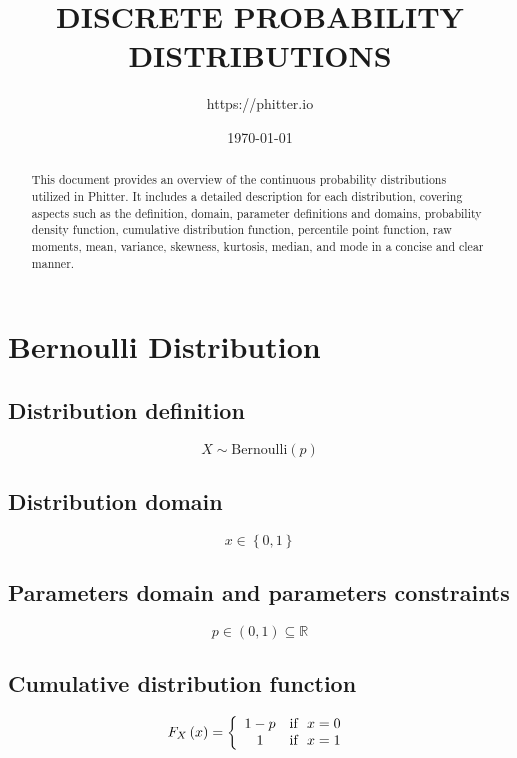 \documentclass{article}
\begin{document}
\title{\textbf{DISCRETE PROBABILITY DISTRIBUTIONS}}
\author{https://phitter.io}
\date{\today}
\maketitle
\begin{abstract}
    This document provides an overview of the continuous probability distributions utilized in Phitter. It includes a detailed description for each distribution, covering aspects such as the definition, domain, parameter definitions and domains, probability density function, cumulative distribution function, percentile point function, raw moments, mean, variance, skewness, kurtosis, median, and mode in a concise and clear manner.
\end{abstract}

\newpage
\tableofcontents


\newpage
\section{Bernoulli Distribution}
\subsection{Distribution definition}
\begin{equation*} X\sim\mathrm{Bernoulli}\left(p\right) \end{equation*}
\subsection{Distribution domain}
\begin{equation*} x\in\left\{0,1\right\} \end{equation*}
\subsection{Parameters domain and parameters constraints}
\begin{equation*} p\in\left(0,1\right)\subseteq\mathbb{R} \end{equation*}
\subsection{Cumulative distribution function}
\begin{equation*} F_{X}\left(x\right)=\left\{\begin{array}{cl} 1-p & \text{if } \ x=0 \\ 1 & \text{if } \ x=1 \end{array} \right.\\ \end{equation*}
\end{document}
